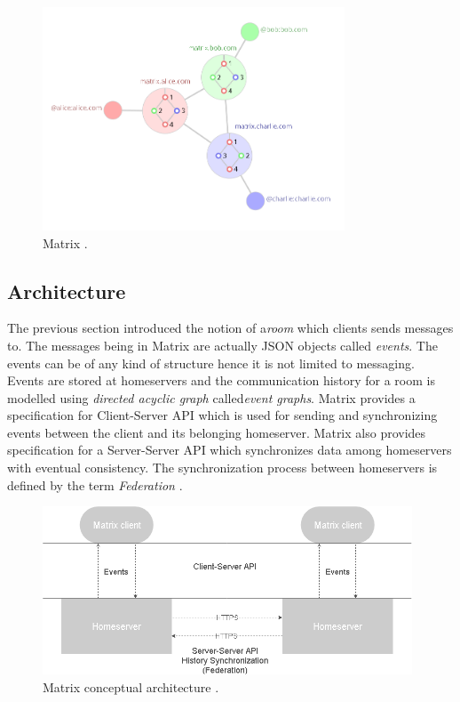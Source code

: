 \begin{figure}[H]
	\centering
	\includegraphics[width=9cm]{figures/matrix5.png}
	\caption{ Matrix \cite{matrixhome}.}
	\label{fig:matrix5}
\end{figure}



\subsection{Architecture}
The previous section introduced the notion of a\emph{room} which clients sends messages to. The messages being in Matrix are actually JSON objects called \emph{events}. The events can be of any kind of structure hence it is not limited to messaging. Events are stored at homeservers and the communication history for a room is modelled using \emph{directed acyclic graph} called\emph{event graphs}. Matrix provides a specification for Client-Server API which is used for sending and synchronizing events between the client and its belonging homeserver. Matrix also provides specification for a Server-Server API which synchronizes data among homeservers with eventual consistency. The synchronization process between homeservers is defined by the term \emph{Federation} \cite{matrixspec}. 


\begin{figure}[H]
	\centering
	\includegraphics[width=11cm]{figures/matrix_architecture.png}
	\caption{ Matrix conceptual architecture \cite{matrixspec}.}
	\label{fig:matrix_architecture}
\end{figure}


